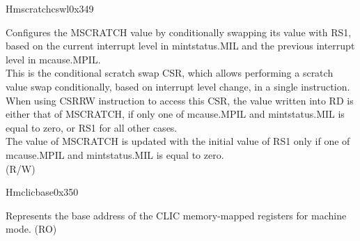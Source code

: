\begin{register}{H}{mscratchcswl}{0x349}\label{regdesc:MSCRATCHCSWL_REG}
%
\regnewline%
\begin{regdesc}\begin{reglist}
\label{fielddesc:MSCRATCHCSWL}\item [MSCRATCHCSWL] Configures the MSCRATCH value by conditionally swapping its value with RS1, based on the current interrupt level in mintstatus.MIL and the previous interrupt level in mcause.MPIL.\\
This is the conditional scratch swap CSR, which allows performing a scratch value swap conditionally, based on interrupt level change, in a single instruction.\\
When using CSRRW instruction to access this CSR, the value written into RD is either that of MSCRATCH, if only one of mcause.MPIL and mintstatus.MIL is equal to zero, or RS1 for all other cases.\\
The value of MSCRATCH is updated with the initial value of RS1 only if one of mcause.MPIL and mintstatus.MIL is equal to zero.\\
(R/W)
\end{reglist}\end{regdesc}
\end{register}

\begin{register}{H}{mclicbase}{0x350}\label{regdesc:MCLICBASE_REG}
%
\regnewline%
\begin{regdesc}\begin{reglist}
\label{fielddesc:MCLICBASE}\item [MCLICBASE] Represents the base address of the CLIC memory-mapped registers for machine mode. (RO)
\end{reglist}\end{regdesc}
\end{register}






